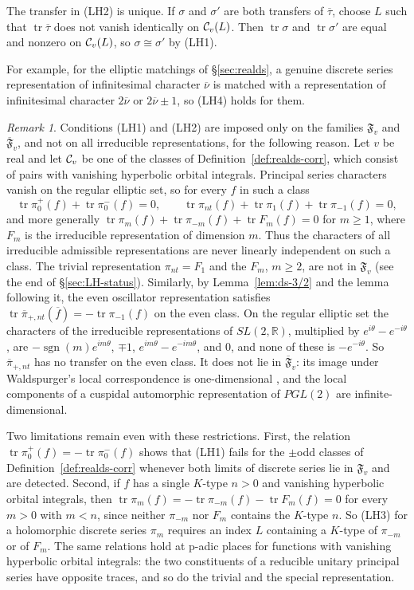 \documentclass[12pt,letterpaper,openany]{book}
\theoremstyle{plain}
\theoremstyle{definition}
\theoremstyle{remark}
\newtheorem{remark}[theorem]{Remark}
\theoremstyle{remark}
\newcommand{\tr}{\operatorname{tr}}
\DeclareMathOperator{\sgn}{sgn}
\begin{document}
The transfer in (LH2) is unique. If $\sigma$ and $\sigma'$ are both
transfers of $\overline\tau$, choose $L$ such that $\tr\overline\tau$ does
not vanish identically on ${\cal C}_v(L)$. Then $\tr\sigma$ and
$\tr\sigma'$ are equal and nonzero on ${\cal C}_v(L)$, so
$\sigma\cong\sigma'$ by (LH1).

For example, for the elliptic matchings of \S\ref{sec:realds}, a genuine
discrete series representation of infinitesimal character $\overline\nu$
is matched with a representation of infinitesimal character
$2\overline\nu$ or $2\overline\nu\pm1$, so (LH4) holds for them.

\begin{remark}\label{rem:LH-families}
Conditions (LH1) and (LH2) are imposed only on the families
$\mathfrak{F}_v$ and $\overline{\mathfrak{F}}_v$, and not on all
irreducible representations, for the following reason. Let $v$ be real
and let ${\cal C}_v$ be one of the classes of
Definition~\ref{def:realds-corr}, which consist of pairs with vanishing
hyperbolic orbital integrals. Principal series characters vanish on the
regular elliptic set, so for every $f$ in such a class
\[
\tr\pi_0^+(f)+\tr\pi_0^-(f)=0,\qquad
\tr\pi_{nt}(f)+\tr\pi_1(f)+\tr\pi_{-1}(f)=0,
\]
and more generally $\tr\pi_m(f)+\tr\pi_{-m}(f)+\tr F_m(f)=0$ for $m\geq1$,
where $F_m$ is the irreducible representation of dimension $m$. Thus the
characters of all irreducible admissible representations are never
linearly independent on such a class. The trivial representation
$\pi_{nt}=F_1$ and the $F_m$, $m\geq2$, are not in $\mathfrak{F}_v$ (see
the end of \S\ref{sec:LH-status}). Similarly, by Lemma~\ref{lem:ds-3/2}
and the lemma following it, the even oscillator representation satisfies
$\tr\overline\pi_{+,nt}(\overline f)=-\tr\pi_{-1}(f)$ on the even class.
On the regular elliptic set the characters of the irreducible
representations of $SL(2,{\mathbb R})$, multiplied by
$e^{i\theta}-e^{-i\theta}$, are $-\sgn(m)e^{im\theta}$, $\mp1$,
$e^{im\theta}-e^{-im\theta}$, and $0$, and none of these is
$-e^{-i\theta}$. So $\overline\pi_{+,nt}$ has no transfer on the even
class. It does not lie in $\overline{\mathfrak{F}}_v$: its image under
Waldspurger's local correspondence is one-dimensional \cite{Wa2}, and
the local components of a cuspidal automorphic representation of $PGL(2)$
are infinite-dimensional.

Two limitations remain even with these restrictions. First, the relation
$\tr\pi_0^+(f)=-\tr\pi_0^-(f)$ shows that (LH1) fails for the $\pm$odd
classes of Definition~\ref{def:realds-corr} whenever both limits of
discrete series lie in $\mathfrak{F}_v$ and are detected. Second, if $f$
has a single $K$-type $n>0$ and vanishing hyperbolic orbital integrals,
then $\tr\pi_m(f)=-\tr\pi_{-m}(f)-\tr F_m(f)=0$ for every $m>0$ with
$m<n$, since neither $\pi_{-m}$ nor $F_m$ contains the $K$-type $n$. So
(LH3) for a holomorphic discrete series $\pi_m$ requires an index $L$
containing a $K$-type of $\pi_{-m}$ or of $F_m$. The same relations hold
at p-adic places for functions with vanishing hyperbolic orbital
integrals: the two constituents of a reducible unitary principal series
have opposite traces, and so do the trivial and the special
representation.
\end{remark}
\end{document}
